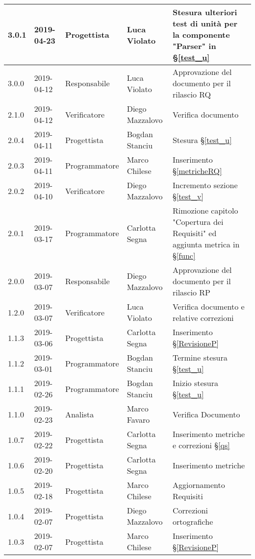 \begin{center}
\begin{longtable}[c]{|m{}|m{}|m{}|m{}|p{}|}
\hline
3.0.1 & 2019-04-23 & Progettista & Luca Violato & Stesura ulteriori test di unità per la componente "Parser" in §\ref{test_u}\\
\hline
\rowcolor{grigio}3.0.0 & 2019-04-12 & Responsabile & Luca Violato & Approvazione del documento per il rilascio RQ\\
\hline
2.1.0 & 2019-04-12 & Verificatore & Diego Mazzalovo & Verifica documento\\
\hline
\rowcolor{grigio}2.0.4 & 2019-04-11 & Progettista & Bogdan Stanciu & Stesura §\ref{test_u} \\
\hline
2.0.3 & 2019-04-11 & Programmatore & Marco Chilese & Inserimento §\ref{metricheRQ}\\
\hline
\rowcolor{grigio}2.0.2 & 2019-04-10 & Verificatore & Diego Mazzalovo & Incremento sezione §\ref{test_v}\\
\hline
2.0.1 & 2019-03-17 & Programmatore & Carlotta Segna & Rimozione capitolo "Copertura dei Requisiti" ed aggiunta metrica in  §\ref{func}\\
\hline
\rowcolor{grigio}2.0.0 & 2019-03-07 & Responsabile & Diego Mazzalovo & Approvazione del documento per il rilascio RP\\
\hline
1.2.0 & 2019-03-07 & Verificatore & Luca Violato & Verifica documento e relative correzioni\\ 
\hline
\rowcolor{grigio}1.1.3 & 2019-03-06 & Progettista & Carlotta Segna & Inserimento §\ref{RevisioneP} \\
\hline
1.1.2 & 2019-03-01 & Programmatore & Bogdan Stanciu & Termine stesura §\ref{test_u} \\
\hline
\rowcolor{grigio}1.1.1 & 2019-02-26 & Programmatore & Bogdan Stanciu & Inizio stesura §\ref{test_u} \\
\hline
1.1.0 & 2019-02-23 & Analista & Marco Favaro & Verifica Documento\\
\hline
\rowcolor{grigio} 1.0.7 & 2019-02-22 & Progettista & Carlotta Segna & Inserimento metriche e correzioni §\ref{qs}\\
\hline
1.0.6 & 2019-02-20 & Progettista & Carlotta Segna & Inserimento metriche\\
\hline
\rowcolor{grigio} 1.0.5 & 2019-02-18 & Progettista & Marco Chilese & Aggiornamento  Requisiti\\
\hline
1.0.4 & 2019-02-07 & Progettista & Diego Mazzalovo & Correzioni ortografiche \\
\hline
\rowcolor{grigio} 1.0.3 & 2019-02-07 & Progettista & Marco Chilese & Inserimento §\ref{RevisioneP} \\

\end{longtable}
\end{center}
